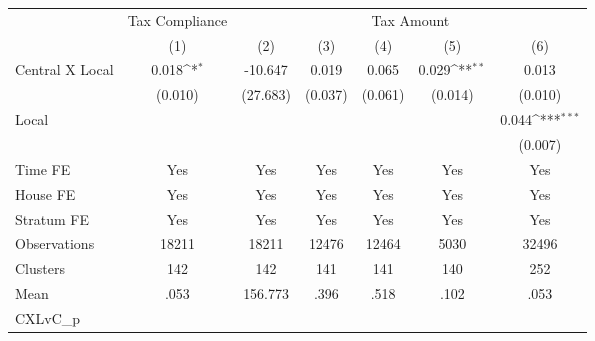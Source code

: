 {
\def\sym#1{\ifmmode^{#1}\else\(^{#1}\)\fi}
\begin{tabular}{l*{6}{c}}
\hline\hline
                &\multicolumn{1}{c}{Tax Compliance}&\multicolumn{5}{c}{Tax Amount}                                                                \\
                &\multicolumn{1}{c}{(1)}         &\multicolumn{1}{c}{(2)}         &\multicolumn{1}{c}{(3)}         &\multicolumn{1}{c}{(4)}         &\multicolumn{1}{c}{(5)}         &\multicolumn{1}{c}{(6)}         \\
\hline
Central X Local &    0.018\sym{*}  &  -10.647         &    0.019         &    0.065         &    0.029\sym{**} &    0.013         \\
                &  (0.010)         & (27.683)         &  (0.037)         &  (0.061)         &  (0.014)         &  (0.010)         \\
Local           &                  &                  &                  &                  &                  &    0.044\sym{***}\\
                &                  &                  &                  &                  &                  &  (0.007)         \\
Time FE         &      Yes         &      Yes         &      Yes         &      Yes         &      Yes         &      Yes         \\
House FE        &      Yes         &      Yes         &      Yes         &      Yes         &      Yes         &      Yes         \\
Stratum FE      &      Yes         &      Yes         &      Yes         &      Yes         &      Yes         &      Yes         \\
\hline
Observations    &    18211         &    18211         &    12476         &    12464         &     5030         &    32496         \\
Clusters        &      142         &      142         &      141         &      141         &      140         &      252         \\
Mean            &     .053         &  156.773         &     .396         &     .518         &     .102         &     .053         \\
CXLvC\_p         &                  &                  &                  &                  &                  &                  \\
\hline\hline
\end{tabular}
}
